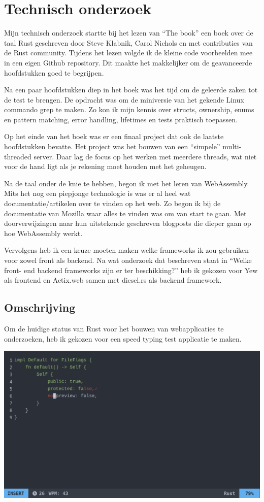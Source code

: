 \chapter{Technisch onderzoek}

Mijn technisch onderzoek startte bij het lezen van “The book” een boek over de taal Rust geschreven
door Steve Klabnik, Carol Nichols en met contributies van de Rust community. Tijdens het lezen
volgde ik de kleine code voorbeelden mee in een eigen Github repository. Dit maakte het makkelijker
om de geavanceerde hoofdstukken goed te begrijpen. 

Na een paar hoofdstukken diep in het boek was het tijd om de geleerde zaken tot de test te brengen.
De opdracht was om de miniversie van het gekende Linux commando grep te maken. Zo kon ik mijn kennis
over structs, ownership, enums en pattern matching, error handling, lifetimes en tests praktisch
toepassen.  

Op het einde van het boek was er een finaal project dat ook de laatste hoofdstukken bevatte. Het
project was het bouwen van een “simpele” multi-threaded server. Daar lag de focus op het werken met
meerdere threads, wat niet voor de hand ligt als je rekening moet houden met het geheugen. 

Na de taal onder de knie te hebben, begon ik met het leren van WebAssembly. Mits het nog een
piepjonge technologie is was er al heel wat documentatie/artikelen over te vinden op het web. Zo
begon ik bij de documentatie van Mozilla waar alles te vinden was om van start te gaan. Met
doorverwijzingen naar hun uitstekende geschreven blogposts die dieper gaan op hoe WebAssembly werkt. 

Vervolgens heb ik een keuze moeten maken welke frameworks ik zou gebruiken voor zowel front als
backend. Na wat onderzoek dat beschreven staat in “Welke front- end backend frameworks zijn er ter
beschikking?” heb ik gekozen voor Yew als frontend en Actix.web samen met diesel.rs als backend
framework.

\clearpage

\section{Omschrijving}

Om de huidige status van Rust voor het bouwen van webapplicaties te onderzoeken, heb ik gekozen voor
een speed typing test applicatie te maken.

\includegraphics[width=\textwidth]{./figures/vim.png}

